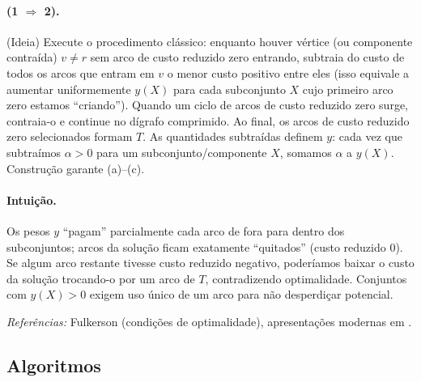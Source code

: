 \documentclass[12pt,a4paper]{article}
\begin{document}
\begin{center}
{{\paragraph{(1 $\Rightarrow$ 2).} (Ideia) Execute o procedimento clássico: enquanto houver vértice (ou componente contraída) $v\neq r$ sem arco de custo reduzido zero entrando, subtraia do custo de todos os arcos que entram em $v$ o menor custo positivo entre eles (isso equivale a aumentar uniformemente $y(X)$ para cada subconjunto $X$ cujo primeiro arco zero estamos “criando”). Quando um ciclo de arcos de custo reduzido zero surge, contraia-o e continue no dígrafo comprimido. Ao final, os arcos de custo reduzido zero selecionados formam $T$. As quantidades subtraídas definem $y$: cada vez que subtraímos $\alpha>0$ para um subconjunto/componente $X$, somamos $\alpha$ a $y(X)$. Construção garante (a)–(c).

\paragraph{Intuição.} Os pesos $y$ “pagam” parcialmente cada arco de fora para dentro dos subconjuntos; arcos da solução ficam exatamente “quitados” (custo reduzido 0). Se algum arco restante tivesse custo reduzido negativo, poderíamos baixar o custo da solução trocando-o por um arco de $T$, contradizendo optimalidade. Conjuntos com $y(X)>0$ exigem uso único de um arco para não desperdiçar potencial.

\medskip
\emph{Referências:} Fulkerson (condições de optimalidade), apresentações modernas em \cite{frank2014connections, schrijver2003comb}.
\label{thm:fulkerson-optimalidade-arborescencia}
}}
\endgroup
\end{center}



\subsection{Algoritmos}
\paragraph{}
\end{document}
